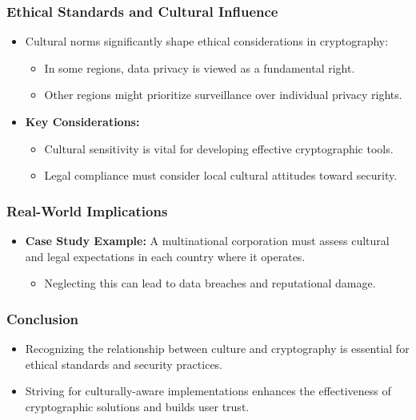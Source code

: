 \documentclass{beamer}
\begin{document}
\begin{frame}[fragile]
    \frametitle{Ethical Standards and Cultural Influence}
    \begin{itemize}
        \item Cultural norms significantly shape ethical considerations in cryptography:
        \begin{itemize}
            \item In some regions, data privacy is viewed as a fundamental right.
            \item Other regions might prioritize surveillance over individual privacy rights.
        \end{itemize}
        \item \textbf{Key Considerations:}
        \begin{itemize}
            \item Cultural sensitivity is vital for developing effective cryptographic tools.
            \item Legal compliance must consider local cultural attitudes toward security.
        \end{itemize}
    \end{itemize}
\end{frame}

\begin{frame}[fragile]
    \frametitle{Real-World Implications}
    \begin{itemize}
        \item \textbf{Case Study Example:} A multinational corporation must assess cultural and legal expectations in each country where it operates.
        \begin{itemize}
            \item Neglecting this can lead to data breaches and reputational damage.
        \end{itemize}
    \end{itemize}
\end{frame}

\begin{frame}[fragile]
    \frametitle{Conclusion}
    \begin{itemize}
        \item Recognizing the relationship between culture and cryptography is essential for ethical standards and security practices.
        \item Striving for culturally-aware implementations enhances the effectiveness of cryptographic solutions and builds user trust.
    \end{itemize}
\end{frame}
\end{document}
